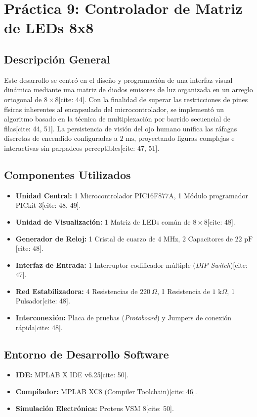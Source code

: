 \section{Práctica 9: Controlador de Matriz de LEDs 8x8}

\subsection{Descripción General}
Este desarrollo se centró en el diseño y programación de una interfaz visual dinámica mediante una matriz de diodos emisores de luz organizada en un arreglo ortogonal de $8\times8$[cite: 44]. Con la finalidad de superar las restricciones de pines físicas inherentes al encapsulado del microcontrolador, se implementó un algoritmo basado en la técnica de multiplexación por barrido secuencial de filas[cite: 44, 51]. La persistencia de visión del ojo humano unifica las ráfagas discretas de encendido configuradas a $2\text{ ms}$, proyectando figuras complejas e interactivas sin parpadeos perceptibles[cite: 47, 51].

\subsection{Componentes Utilizados}
\begin{itemize}
    \item \textbf{Unidad Central:} 1 Microcontrolador PIC16F877A, 1 Módulo programador PICkit 3[cite: 48, 49].
    \item \textbf{Unidad de Visualización:} 1 Matriz de LEDs común de $8\times8$[cite: 48].
    \item \textbf{Generador de Reloj:} 1 Cristal de cuarzo de $4\text{ MHz}$, 2 Capacitores de $22\text{ pF}$[cite: 48].
    \item \textbf{Interfaz de Entrada:} 1 Interruptor codificador múltiple (\textit{DIP Switch})[cite: 47].
    \item \textbf{Red Estabilizadora:} 4 Resistencias de $220\ \Omega$, 1 Resistencia de $1\text{ k}\Omega$, 1 Pulsador[cite: 48].
    \item \textbf{Interconexión:} Placa de pruebas (\textit{Protoboard}) y Jumpers de conexión rápida[cite: 48].
\end{itemize}

\subsection{Entorno de Desarrollo Software}
\begin{itemize}
    \item \textbf{IDE:} MPLAB X IDE v6.25[cite: 50].
    \item \textbf{Compilador:} MPLAB XC8 (Compiler Toolchain)[cite: 46].
    \item \textbf{Simulación Electrónica:} Proteus VSM 8[cite: 50].
\end{itemize}

